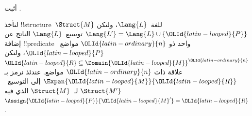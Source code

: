\documentclass[../../../include/open-logic-section]{subfiles}
\begin{document}
\begin{prob}
أثبت .
\end{prob}

\begin{defn}
لنأخذ !!{structure}~$\Struct{M}$ للغة~$\Lang{L}$، ولتكن
$\Lang{L'} = \Lang{L} \cup \{\OLId{latin-looped}{P}\}$ توسيع~$\Lang{L}$ الناتج عن إضافة
!!{predicate} واحد ذو $\OLId{latin-ordinary}{n}$ مواضع~$\OLId{latin-looped}{P}$، ولتكن $\OLId{latin-looped}{R} \subseteq \Domain{\OLId{latin-looped}{M}}^\OLId{latin-ordinary}{n}$
علاقة ذات $\OLId{latin-ordinary}{n}$ مواضع. عندئذ نرمز بـ $\Expan{\OLId{latin-looped}{M}}{\OLId{latin-looped}{R}}$ إلى التوسيع~$\Struct{M'}$
لـ~$\Struct{M}$ الذي فيه $\Assign{\OLId{latin-looped}{P}}{\OLId{latin-looped}{M}'} = \OLId{latin-looped}{R}$.
\end{defn}
\end{document}
